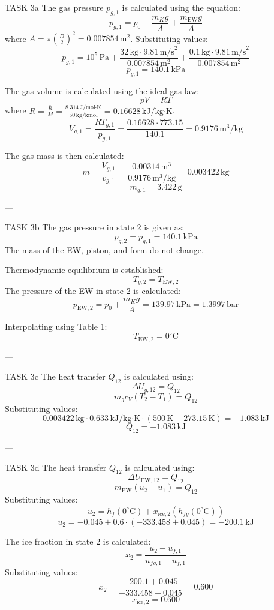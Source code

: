 TASK 3a  
The gas pressure \( p_{g,1} \) is calculated using the equation:  
\[
p_{g,1} = p_0 + \frac{m_K g}{A} + \frac{m_{\text{EW}} g}{A}
\]  
where \( A = \pi \left(\frac{D}{2}\right)^2 = 0.007854 \, \text{m}^2 \). Substituting values:  
\[
p_{g,1} = 10^5 \, \text{Pa} + \frac{32 \, \text{kg} \cdot 9.81 \, \text{m/s}^2}{0.007854 \, \text{m}^2} + \frac{0.1 \, \text{kg} \cdot 9.81 \, \text{m/s}^2}{0.007854 \, \text{m}^2}
\]  
\[
p_{g,1} = 140.1 \, \text{kPa}
\]  

The gas volume is calculated using the ideal gas law:  
\[
p V = R T
\]  
where \( R = \frac{\bar{R}}{M} = \frac{8.314 \, \text{J/mol·K}}{50 \, \text{kg/kmol}} = 0.16628 \, \text{kJ/kg·K} \).  
\[
V_{g,1} = \frac{R T_{g,1}}{p_{g,1}} = \frac{0.16628 \cdot 773.15}{140.1} = 0.9176 \, \text{m}^3/\text{kg}
\]  

The gas mass is then calculated:  
\[
m = \frac{V_{g,1}}{v_{g,1}} = \frac{0.00314 \, \text{m}^3}{0.9176 \, \text{m}^3/\text{kg}} = 0.003422 \, \text{kg}
\]  
\[
m_{g,1} = 3.422 \, \text{g}
\]  

---

TASK 3b  
The gas pressure in state 2 is given as:  
\[
p_{g,2} = p_{g,1} = 140.1 \, \text{kPa}
\]  
The mass of the EW, piston, and form do not change.  

Thermodynamic equilibrium is established:  
\[
T_{g,2} = T_{\text{EW},2}
\]  
The pressure of the EW in state 2 is calculated:  
\[
p_{\text{EW},2} = p_0 + \frac{m_K g}{A} = 139.97 \, \text{kPa} = 1.3997 \, \text{bar}
\]  

Interpolating using Table 1:  
\[
T_{\text{EW},2} = 0^\circ \text{C}
\]  

---

TASK 3c  
The heat transfer \( Q_{12} \) is calculated using:  
\[
\Delta U_{g,12} = Q_{12}
\]  
\[
m_g c_V (T_2 - T_1) = Q_{12}
\]  
Substituting values:  
\[
0.003422 \, \text{kg} \cdot 0.633 \, \text{kJ/kg·K} \cdot (500 \, \text{K} - 273.15 \, \text{K}) = -1.083 \, \text{kJ}
\]  
\[
Q_{12} = -1.083 \, \text{kJ}
\]  

---

TASK 3d  
The heat transfer \( Q_{12} \) is calculated using:  
\[
\Delta U_{\text{EW},12} = Q_{12}
\]  
\[
m_{\text{EW}} (u_2 - u_1) = Q_{12}
\]  
Substituting values:  
\[
u_2 = h_f(0^\circ \text{C}) + x_{\text{ice},2} (h_{fg}(0^\circ \text{C}))
\]  
\[
u_2 = -0.045 + 0.6 \cdot (-333.458 + 0.045) = -200.1 \, \text{kJ}
\]  

The ice fraction in state 2 is calculated:  
\[
x_2 = \frac{u_2 - u_{f,1}}{u_{fg,1} - u_{f,1}}
\]  
Substituting values:  
\[
x_2 = \frac{-200.1 + 0.045}{-333.458 + 0.045} = 0.600
\]  
\[
x_{\text{ice},2} = 0.600
\]  